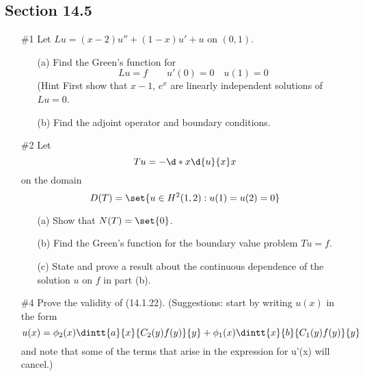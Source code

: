 \documentclass[11pt, oneside]{article}
\begin{document}
\pagebreak
\subsection*{Section 14.5}
\begin{enumerate}
  \item[\#1]
    Let $Lu = (x - 2)u'' + (1 - x)u' + u$ on $(0, 1)$.
    \begin{enumerate}
      \item[(a)]
        Find the Green's function for
        \[
          Lu = f \qquad u'(0) = 0 \quad u(1) = 0
        \]
        (Hint First show that $x - 1$, $e^x$ are linearly independent
        solutions of $Lu = 0$.

      \item[(b)]
        Find the adjoint operator and boundary conditions.
    \end{enumerate}

  \pagebreak
  \item[\#2]
    Let
    \[
      Tu = - \d*{x \d{u}{x}}{x}
    \]
    on the domain
    \[
      D(T) = \set{u \in H^2(1, 2): u(1) = u(2) = 0}
    \]
    \begin{enumerate}
      \item[(a)]
        Show that $N(T) = \set{0}$.
      \item[(b)]
        Find the Green's function for the boundary value problem $Tu = f$.
      \item[(c)]
        State and prove a result about the continuous dependence of the
        solution $u$ on $f$ in part (b).
    \end{enumerate}

  \pagebreak
  \item[\#4]
    Prove the validity of (14.1.22).
    (Suggestions: start by writing $u(x)$ in the form
    \[
      u(x) = \phi_2(x) \dintt{a}{x}{C_2(y)f(y)}{y} + \phi_1(x) \dintt{x}{b}{C_1(y)f(y)}{y}
    \]
    and note that some of the terms that arise in the expression for u'(x) will
    cancel.)
\end{enumerate}
\end{document}
